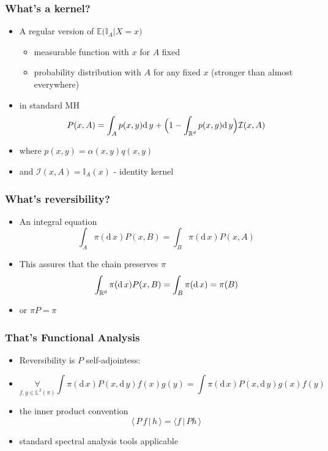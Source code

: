 \begin{frame}
		\frametitle{ What's a kernel?}
	\begin{itemize}
		\item[] A regular version of $ \mathbb{E}\Big( \mathbb{I}_A | X = x \Big)$
		\begin{itemize}
			\item measurable function with $x$ for $A$ fixed
			\item probability distribution with $A$ for any fixed $x$ (stronger than almost everywhere) 	
		\end{itemize}
		
		\item[] in standard MH 
			$$ P(x,A) =  \int_A p(x,y) \mathrm{d}\,y + \Big( 1 - \int_{\mathbb{R}^d} p(x,y) \mathrm{d}\,y  \Big) \mathcal{I}(x,A)$$ 

		\item[] where $p(x,y) = \alpha(x,y) q(x,y)$
		\item[] and $\mathcal{I}(x,A) = \mathbb{I}_A (x) $ - identity kernel
	\end{itemize}	
\end{frame}

\begin{frame}
		\frametitle{ What's reversibility?}
	\begin{itemize}
		\item[] An integral equation
			$$ \int_A \pi( \mathrm{d}\, x) P(x, B) = \int_B \pi( \mathrm{d}\, x ) P(x, A)$$
		
		\item[] This assures that the chain preserves $\pi$
			$$ \int_{\mathbb{R}^d} \pi( \mathrm{d}\,x ) P(x, B) = \int_B \pi( \mathrm{d}\,x ) = \pi(B) $$
		
		\item[] or $ \pi P = \pi $
	\end{itemize}	
\end{frame}

\begin{frame}
		\frametitle{ That's Functional Analysis }
	\begin{itemize}
		\item[] Reversibility is $P$ self-adjointess:
		\item[] $$ \underset{f,g \in \mathbb{L}^2(\pi) }{\forall} \int \pi( \mathrm{d}\,x ) P(x, \mathrm{d}\,y) f(x) g(y) = \int \pi( \mathrm{d}\,x ) P(x, \mathrm{d}\,y) g(x) f(y)$$
		\item[] the inner product convention 
			$$ \langle\, P \, f\,|\, h\,\rangle = \langle f\,|\,  P h \,\rangle $$
		\item[] standard spectral analysis tools applicable
	\end{itemize}	
\end{frame}

